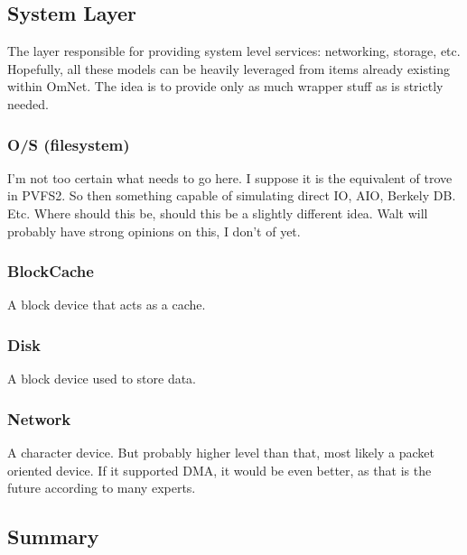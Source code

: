 \documentclass[11pt]{article}
\begin{document}
\subsection{System Layer}
The layer responsible for providing system level services: networking,
storage, etc.  Hopefully, all these models can be heavily leveraged from items
already existing within OmNet.  The idea is to provide only as much wrapper
stuff as is strictly needed.

\subsubsection{O/S (filesystem)}
I'm not too certain what needs to go here.  I suppose it is the equivalent of
trove in PVFS2.  So then something capable of simulating direct IO, AIO,
Berkely DB.  Etc.  Where should this be, should this be a slightly different
idea.  Walt will probably have strong opinions on this, I don't of yet.

\subsubsection{BlockCache}
A block device that acts as a cache.

\subsubsection{Disk}
A block device used to store data.

\subsubsection{Network}
A character device.  But probably higher level than that, most likely a packet
oriented device.  If it supported  DMA, it would be even better, as that is
the future according to many experts.

\subsection{Summary}
\end{document}
